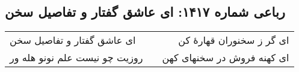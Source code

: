\begin{center}
\section*{رباعی شماره ۱۴۱۷: ای عاشق گفتار و تفاصیل سخن}
\label{sec:1417}
\begin{longtable}{l p{0.5cm} r}
ای عاشق گفتار و تفاصیل سخن
&&
ای گر ز سخنوران قهارهٔ کن
\\
روزیت چو نیست علم نونو هله ور
&&
ای کهنه فروش در سخنهای کهن
\\
\end{longtable}
\end{center}
